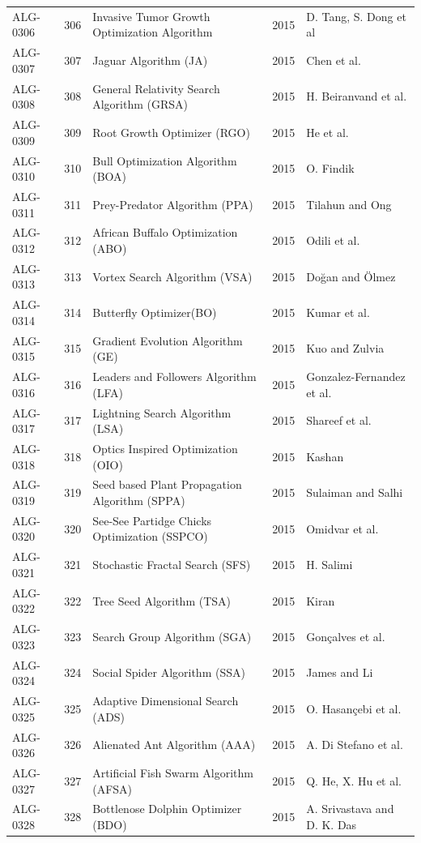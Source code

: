 \documentclass[8pt]{article}
\begin{document}
\begin{landscape}
\begin{longtable}{P{1.7cm}rP{10.0cm}rP{7.2cm}}
ALG-0306 & 306 & Invasive Tumor Growth Optimization Algorithm & 2015 & D. Tang, S. Dong et al \\
ALG-0307 & 307 & Jaguar Algorithm (JA) & 2015 & Chen et al. \\
ALG-0308 & 308 & General Relativity Search Algorithm (GRSA) & 2015 & H. Beiranvand et al. \\
ALG-0309 & 309 & Root Growth Optimizer (RGO) & 2015 & He et al. \\
ALG-0310 & 310 & Bull Optimization Algorithm (BOA) & 2015 & O. Findik \\
ALG-0311 & 311 & Prey-Predator Algorithm (PPA) & 2015 & Tilahun and Ong \\
ALG-0312 & 312 & African Buffalo Optimization (ABO) & 2015 & Odili et al. \\
ALG-0313 & 313 & Vortex Search Algorithm (VSA) & 2015 & Doğan and Ölmez \\
ALG-0314 & 314 & Butterfly Optimizer(BO) & 2015 & Kumar et al. \\
ALG-0315 & 315 & Gradient Evolution Algorithm (GE) & 2015 & Kuo and Zulvia \\
ALG-0316 & 316 & Leaders and Followers Algorithm (LFA) & 2015 & Gonzalez-Fernandez et al. \\
ALG-0317 & 317 & Lightning Search Algorithm (LSA) & 2015 & Shareef et al. \\
ALG-0318 & 318 & Optics Inspired Optimization (OIO) & 2015 & Kashan \\
ALG-0319 & 319 & Seed based Plant Propagation Algorithm (SPPA) & 2015 & Sulaiman and Salhi \\
ALG-0320 & 320 & See-See Partidge Chicks Optimization (SSPCO) & 2015 & Omidvar et al. \\
ALG-0321 & 321 & Stochastic Fractal Search (SFS) & 2015 & H. Salimi \\
ALG-0322 & 322 & Tree Seed Algorithm (TSA) & 2015 & Kiran \\
ALG-0323 & 323 & Search Group Algorithm (SGA) & 2015 & Gonçalves et al. \\
ALG-0324 & 324 & Social Spider Algorithm (SSA) & 2015 & James and Li \\
ALG-0325 & 325 & Adaptive Dimensional Search (ADS) & 2015 & O. Hasançebi et al. \\
ALG-0326 & 326 & Alienated Ant Algorithm (AAA) & 2015 & A. Di Stefano et al. \\
ALG-0327 & 327 & Artificial Fish Swarm Algorithm (AFSA) & 2015 & Q. He, X. Hu et al. \\
ALG-0328 & 328 & Bottlenose Dolphin Optimizer (BDO) & 2015 & A. Srivastava and D. K. Das \\

\end{longtable}
\end{landscape}
\end{document}
